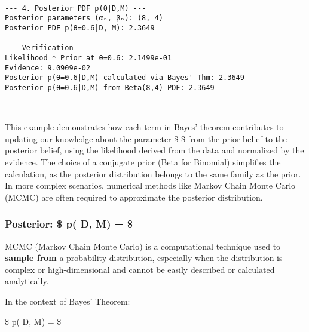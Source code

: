 \documentclass[11pt]{article}
\begin{document}
    \begin{Verbatim}[commandchars=\\\{\}]

--- 4. Posterior PDF p(θ|D,M) ---
Posterior parameters (αₙ, βₙ): (8, 4)
Posterior PDF p(θ=0.6|D, M): 2.3649

--- Verification ---
Likelihood * Prior at θ=0.6: 2.1499e-01
Evidence: 9.0909e-02
Posterior p(θ=0.6|D,M) calculated via Bayes' Thm: 2.3649
Posterior p(θ=0.6|D,M) from Beta(8,4) PDF: 2.3649
    \end{Verbatim}

    \begin{center}
    \end{center}
    { \hspace*{\fill} \\}
    
    This example demonstrates how each term in Bayes' theorem contributes to
updating our knowledge about the parameter \$ \theta \$ from the prior
belief to the posterior belief, using the likelihood derived from the
data and normalized by the evidence. The choice of a conjugate prior
(Beta for Binomial) simplifies the calculation, as the posterior
distribution belongs to the same family as the prior. In more complex
scenarios, numerical methods like Markov Chain Monte Carlo (MCMC) are
often required to approximate the posterior distribution.

    \subsubsection{\texorpdfstring{Posterior: \$ p(\theta \textbar{} D, M) =
\$}{Posterior: \$ p(\textbar{} D, M) =  \$}}\label{posterior-p-d-m}

    MCMC (Markov Chain Monte Carlo) is a computational technique used to
\textbf{sample from} a probability distribution, especially when the
distribution is complex or high-dimensional and cannot be easily
described or calculated analytically.

In the context of Bayes' Theorem:

\$ p(\theta \textbar{} D, M) =
 \$
\end{document}
